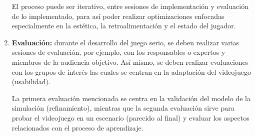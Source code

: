 \begin{enumerate}
El proceso puede ser iterativo, entre sesiones de implementación y evaluación de
lo implementado, para así poder realizar optimizaciones enfocadas especialmente
en la estética, la retroalimentación y el estado del jugador.

\item \textbf{Evaluación:} durante el desarrollo del juego serio, se deben
    realizar varias sesiones de evaluación, por ejemplo, con los responsables o
    expertos y miembros de la audiencia objetivo. Así mismo, se deben realizar
    evaluaciones con los grupos de interés las cuales se centran en la adaptación
    del videojuego (usabilidad). 

La primera evaluación mencionada se centra en la validación del modelo de la simulación
(refinamiento), mientras que la segunda evaluación sirve para probar el videojuego en
un escenario (parecido al final) y evaluar los aspectos relacionados con el
proceso de aprendizaje.  

\end{enumerate}
